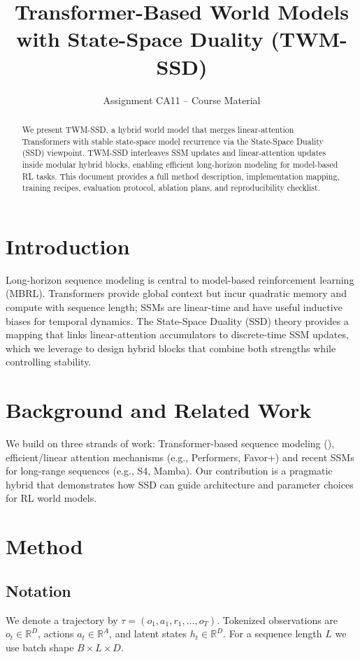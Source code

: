 \documentclass{article}
\title{Transformer-Based World Models with State-Space Duality (TWM-SSD)}
\author{Assignment CA11 -- Course Material}
\begin{document}
\maketitle

\begin{abstract}
We present TWM-SSD, a hybrid world model that merges linear-attention Transformers with stable state-space model recurrence via the State-Space Duality (SSD) viewpoint. TWM-SSD interleaves SSM updates and linear-attention updates inside modular hybrid blocks, enabling efficient long-horizon modeling for model-based RL tasks. This document provides a full method description, implementation mapping, training recipes, evaluation protocol, ablation plans, and reproducibility checklist.
\end{abstract}

\section{Introduction}
Long-horizon sequence modeling is central to model-based reinforcement learning (MBRL). Transformers provide global context but incur quadratic memory and compute with sequence length; SSMs are linear-time and have useful inductive biases for temporal dynamics. The State-Space Duality (SSD) theory provides a mapping that links linear-attention accumulators to discrete-time SSM updates, which we leverage to design hybrid blocks that combine both strengths while controlling stability.

\section{Background and Related Work}
We build on three strands of work: Transformer-based sequence modeling (\cite{vaswani2017attention}), efficient/linear attention mechanisms (e.g., Performers, Favor+) and recent SSMs for long-range sequences (e.g., S4, Mamba). Our contribution is a pragmatic hybrid that demonstrates how SSD can guide architecture and parameter choices for RL world models.

\section{Method}
\subsection{Notation}
We denote a trajectory by $\tau=(o_1,a_1,r_1,\dots,o_T)$. Tokenized observations are $o_t\in\mathbb{R}^{D}$, actions $a_t\in\mathbb{R}^{A}$, and latent states $h_t\in\mathbb{R}^D$. For a sequence length $L$ we use batch shape $B\times L\times D$.
\end{document}
